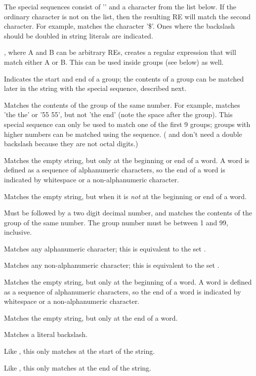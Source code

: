 The special sequences consist of '\code{\e}' and a character
from the list below.  If the ordinary character is not on the list,
then the resulting RE will match the second character.  For example,
\code{\e\$} matches the character '\$'.  Ones where the backslash
should be doubled in string literals are indicated.

\begin{itemize}
\item[\code{\e|}], where A and B can be arbitrary REs,
creates a regular expression that will match either A or B.  This can
be used inside groups (see below) as well.
%
\item[\code{\e( \e)}] Indicates the start and end of a group; the
contents of a group can be matched later in the string with the
\code{\e [1-9]} special sequence, described next.
%
{\fulllineitems\item[\code{\e \e 1, ... \e \e 7, \e 8, \e 9}]
Matches the contents of the group of the same
number.  For example,  matches 'the the' or
'55 55', but not 'the end' (note the space after the group).  This
special sequence can only be used to match one of the first 9 groups;
groups with higher numbers can be matched using the 
sequence.  ( and  don't need a double backslash
because they are not octal digits.)}
%
\item[\code{\e \e b}] Matches the empty string, but only at the
beginning or end of a word.  A word is defined as a sequence of
alphanumeric characters, so the end of a word is indicated by
whitespace or a non-alphanumeric character.
%
\item[\code{\e B}] Matches the empty string, but when it is \emph{not} at the
beginning or end of a word.
%
\item[\code{\e v}] Must be followed by a two digit decimal number, and
matches the contents of the group of the same number.  The group number must be between 1 and 99, inclusive.
%
\item[\code{\e w}]Matches any alphanumeric character; this is
equivalent to the set \code{[a-zA-Z0-9]}.
%
\item[\code{\e W}] Matches any non-alphanumeric character; this is
equivalent to the set \code{[\^a-zA-Z0-9]}.
\item[\code{\e <}] Matches the empty string, but only at the beginning of a
word.  A word is defined as a sequence of alphanumeric characters, so
the end of a word is indicated by whitespace or a non-alphanumeric 
character.
\item[\code{\e >}] Matches the empty string, but only at the end of a
word.

\item[\code{\e \e \e \e}] Matches a literal backslash.

\item[\code{\e `}] Like \code{\^}, this only matches at the start of the
string.
\item[\code{\e \e '}] Like \code{\$}, this only matches at the end of the
string.
\end{itemize}

